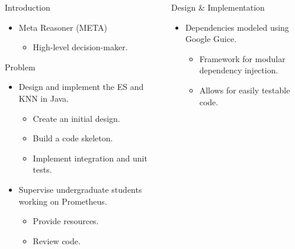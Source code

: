 \documentclass[final]{beamer} %
\newlength{\columnheight}
\begin{document}
\begin{frame}
\begin{columns}
\begin{column}{.3\textwidth}
{\begin{block}{Introduction}
					\begin{itemize}
						\item Meta Reasoner (META)
						\begin{itemize}
							\item High-level decision-maker.
						\end{itemize}
					\end{itemize}
				
				\end{block}
				\begin{block}{Problem}
				\begin{itemize}
					\item Design and implement the ES and KNN in Java.
					\begin{itemize}
						\item Create an initial design.
						\item Build a code skeleton.
						\item Implement integration and unit tests.
					\end{itemize}
				
					\item Supervise undergraduate students working on Prometheus.
					\begin{itemize}
						\item Provide resources.
						\item Review code.
					\end{itemize}
				\end{itemize}
				\end{block}
			}
			\end{column}
			\begin{column}{.34\textwidth}
				\parbox[t][\columnheight]{\textwidth}{
				\begin{block}{Design \& Implementation}
					\begin{itemize}
						\item Dependencies modeled using Google Guice.
						\begin{itemize}
							\item Framework for modular dependency injection.
							\item Allows for easily testable code.
						\end{itemize}
					\end{itemize}
					

\end{block}}
\end{column}
\end{columns}
\end{frame}
\end{document}
